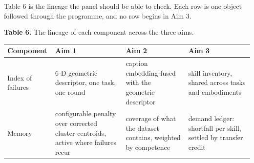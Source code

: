 \documentclass[
  11pt,
]{article}
\begin{document}
Table 6 is the lineage the panel should be able to check. Each row is
one object followed through the programme, and no row begins in Aim 3.

\textbf{Table 6.} The lineage of each component across the three aims.

\begin{longtable}[]{@{}llll@{}}
\toprule
\begin{minipage}[b]{0.16\columnwidth}\raggedright
Component\strut
\end{minipage} & \begin{minipage}[b]{0.24\columnwidth}\raggedright
Aim 1\strut
\end{minipage} & \begin{minipage}[b]{0.24\columnwidth}\raggedright
Aim 2\strut
\end{minipage} & \begin{minipage}[b]{0.24\columnwidth}\raggedright
Aim 3\strut
\end{minipage}\tabularnewline
\midrule
\endhead
\begin{minipage}[t]{0.16\columnwidth}\raggedright
Index of failures\strut
\end{minipage} & \begin{minipage}[t]{0.24\columnwidth}\raggedright
6-D geometric descriptor, one task, one round\strut
\end{minipage} & \begin{minipage}[t]{0.24\columnwidth}\raggedright
caption embedding fused with the geometric descriptor\strut
\end{minipage} & \begin{minipage}[t]{0.24\columnwidth}\raggedright
skill inventory, shared across tasks and embodiments\strut
\end{minipage}\tabularnewline
\begin{minipage}[t]{0.16\columnwidth}\raggedright
Memory\strut
\end{minipage} & \begin{minipage}[t]{0.24\columnwidth}\raggedright
configurable penalty over corrected cluster centroids, active where
failures recur\strut
\end{minipage} & \begin{minipage}[t]{0.24\columnwidth}\raggedright
coverage of what the dataset contains, weighted by competence\strut
\end{minipage} & \begin{minipage}[t]{0.24\columnwidth}\raggedright
demand ledger: shortfall per skill, settled by transfer credit\strut

\end{minipage}
\end{longtable}
\end{document}
